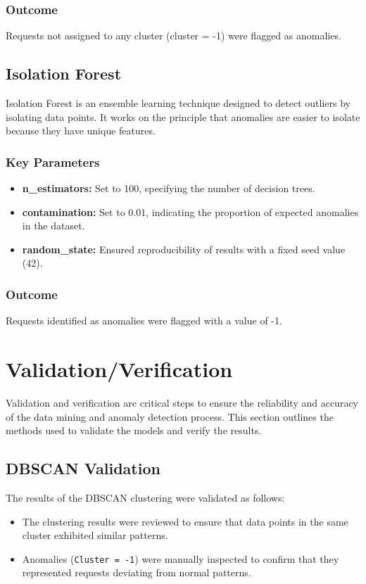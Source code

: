 \subsubsection{Outcome}
Requests not assigned to any cluster (cluster = -1) were flagged as anomalies.

\subsection{Isolation Forest}
Isolation Forest is an ensemble learning technique designed to detect outliers by isolating data points. It works on the principle that anomalies are easier to isolate because they have unique features.
\subsubsection{Key Parameters}
\begin{itemize}
	\item \textbf{n\_estimators:} Set to 100, specifying the number of decision trees.
	\item \textbf{contamination:} Set to 0.01, indicating the proportion of expected anomalies in the dataset.
	\item \textbf{random\_state:} Ensured reproducibility of results with a fixed seed value (42).
\end{itemize}
\subsubsection{Outcome}
Requests identified as anomalies were flagged with a value of -1.

\section{Validation/Verification}
Validation and verification are critical steps to ensure the reliability and accuracy of the data mining and anomaly detection process. This section outlines the methods used to validate the models and verify the results.

\subsection{DBSCAN Validation}
The results of the DBSCAN clustering were validated as follows:
\begin{itemize}
	\item The clustering results were reviewed to ensure that data points in the same cluster exhibited similar patterns.
	\item Anomalies (\texttt{Cluster = -1}) were manually inspected to confirm that they represented requests deviating from normal patterns.
\end{itemize}

